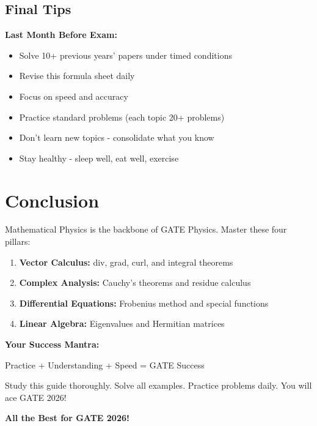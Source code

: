 \documentclass[12pt,a4paper]{article}
\theoremstyle{definition}
\begin{document}
\subsection{Final Tips}

\begin{tipbox}
\textbf{Last Month Before Exam:}
\begin{itemize}
    \item Solve 10+ previous years' papers under timed conditions
    \item Revise this formula sheet daily
    \item Focus on speed and accuracy
    \item Practice standard problems (each topic 20+ problems)
    \item Don't learn new topics - consolidate what you know
    \item Stay healthy - sleep well, eat well, exercise
\end{itemize}
\end{tipbox}

\newpage
\section{Conclusion}

Mathematical Physics is the backbone of GATE Physics. Master these four pillars:
\begin{enumerate}
    \item \textbf{Vector Calculus:} div, grad, curl, and integral theorems
    \item \textbf{Complex Analysis:} Cauchy's theorems and residue calculus
    \item \textbf{Differential Equations:} Frobenius method and special functions
    \item \textbf{Linear Algebra:} Eigenvalues and Hermitian matrices
\end{enumerate}

\begin{importantbox}
\textbf{Your Success Mantra:}
\begin{center}
\Large
Practice + Understanding + Speed = GATE Success
\end{center}

Study this guide thoroughly. Solve all examples. Practice problems daily. You will ace GATE 2026!
\end{importantbox}

\vspace{1cm}
\begin{center}
\textbf{\Large All the Best for GATE 2026!}
\end{center}
\end{document}
